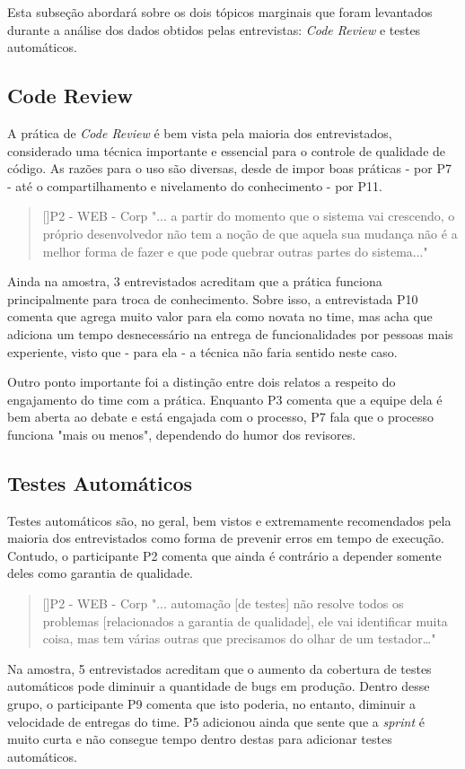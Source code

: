 Esta subseção abordará sobre os dois tópicos marginais que foram levantados durante a análise dos dados obtidos pelas entrevistas: \emph{Code Review} e testes automáticos.

\subsection{Code Review}

A prática de \emph{Code Review} \cite{codeReview} é bem vista pela maioria dos entrevistados, considerado uma técnica importante e essencial para o controle de qualidade de código. As razões para o uso são diversas, desde de impor boas práticas - por P7 - até o compartilhamento e nivelamento do conhecimento - por P11.

\begin{quotation}[]{P2 - WEB - Corp}
    "... a partir do momento que o sistema vai crescendo, o próprio desenvolvedor não tem a noção de que aquela sua mudança não é a melhor forma de fazer e que pode quebrar outras partes do sistema..."
\end{quotation}

Ainda na amostra, 3 entrevistados acreditam que a prática funciona principalmente para troca de conhecimento. Sobre isso, a entrevistada P10 comenta que agrega muito valor para ela como novata no time, mas acha que adiciona um tempo desnecessário na entrega de funcionalidades por pessoas mais experiente, visto que - para ela - a técnica não faria sentido neste caso.

Outro ponto importante foi a distinção entre dois relatos a respeito do engajamento do time com a prática. Enquanto P3 comenta que a equipe dela é bem aberta ao debate e está engajada com o processo, P7 fala que o processo funciona "mais ou menos", dependendo do humor dos revisores.

\subsection{Testes Automáticos}

Testes automáticos são, no geral, bem vistos e extremamente recomendados pela maioria dos entrevistados como forma de prevenir erros em tempo de execução. Contudo, o participante P2 comenta que ainda é contrário a depender somente deles como garantia de qualidade.

\begin{quotation}[]{P2 - WEB - Corp}
    "... automação [de testes] não resolve todos os problemas [relacionados a garantia de qualidade], ele vai identificar muita coisa, mas tem várias outras que precisamos do olhar de um testador…"
\end{quotation}

Na amostra, 5 entrevistados acreditam que o aumento da cobertura de testes automáticos pode diminuir a quantidade de bugs em produção. Dentro desse grupo, o participante P9 comenta que isto poderia, no entanto, diminuir a velocidade de entregas do time. P5 adicionou ainda que sente que a \emph{sprint} é muito curta e não consegue tempo dentro destas para adicionar testes automáticos.

